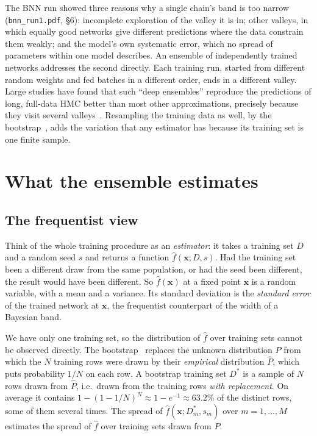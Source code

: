 \documentclass[11pt]{article}
\newcommand{\file}[1]{\nolinkurl{#1}}
\newcommand{\bx}{\boldsymbol{x}}
\begin{document}
The BNN run showed three reasons why a single chain's band is too narrow
(\file{bnn_run1.pdf}, \S6): incomplete exploration of the valley it is in; other valleys,
in which equally good networks give different predictions where the data constrain them
weakly; and the model's own systematic error, which no spread of parameters within one
model describes. An ensemble of independently trained networks addresses the second
directly. Each training run, started from different random weights and fed batches in a
different order, ends in a different valley. Large studies have found that such
``deep ensembles'' reproduce the predictions of long, full-data HMC better than most
other approximations, precisely because they visit several valleys~\cite{izmailov2021,
wilson2020, lakshminarayanan2017}. Resampling the training data as well, by the
bootstrap~\cite{efron1979, efron1993}, adds the variation that any estimator has because
its training set is one finite sample.

\section{What the ensemble estimates}
\label{sec:what}

\subsection{The frequentist view}

Think of the whole training procedure as an \emph{estimator}: it takes a training set
$D$ and a random seed $s$ and returns a function $\hat f(\bx; D, s)$. Had the training set
been a different draw from the same population, or had the seed been different, the
result would have been different. So $\hat f(\bx)$ at a fixed point $\bx$ is a random
variable, with a mean and a variance. Its standard deviation is the \emph{standard error}
of the trained network at $\bx$, the frequentist counterpart of the width of a Bayesian
band.

\begin{aside}
We have only one training set, so the distribution of $\hat f$ over training sets cannot
be observed directly. The bootstrap~\cite{efron1979, efron1993} replaces the unknown
distribution $P$ from which the $N$ training rows were drawn by their \emph{empirical}
distribution $\hat P$, which puts probability $1/N$ on each row. A bootstrap training set
$D^*$ is a sample of $N$ rows drawn from $\hat P$, i.e.\ drawn from the training rows
\emph{with replacement}. On average it contains $1 - (1 - 1/N)^N \approx 1 - e^{-1}
\approx 63.2\%$ of the distinct rows, some of them several times. The spread of
$\hat f(\bx; D^*_m, s_m)$ over $m = 1, \ldots, M$ estimates the spread of $\hat f$ over
training sets drawn from $P$.
\end{aside}
\end{document}
